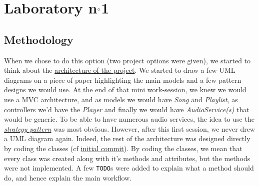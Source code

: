\documentclass{report}
\begin{document}
\section{Laboratory n$\degree$1}
\subsection{Methodology}

When we chose to do this option (two project options were given), we started to think about the \href{https://s3.amazonaws.com/applause-devmktg/2015/12/02/57kz3goral_YOU_DONT_SAY.png}{architecture of the project}. We started to draw a few UML diagrams on a piece of paper highlighting the main models and a few pattern designs we would use. At the end of that mini work-session, we knew we would use a MVC architecture, and as models we would have \textit{Song} and \textit{Playlist}, as controllers we'd have the \textit{Player} and finally we would have \textit{AudioService(s)} that would be generic. To be able to have numerous audio services, the idea to use the \href{https://en.wikipedia.org/wiki/Strategy_pattern}{\textit{strategy pattern}} was most obvious. However, after this first session, we never drew a UML diagram again. Indeed, the rest of the architecture was designed directly by coding the classes (cf \href{https://github.com/cnamal/arch-LOG8430/commit/d4953e0fc8fc3a7a8641dd7cacef69496f3ca011}{initial commit}). By coding the classes, we mean that every class was created along with it's methods and attributes, but the methods were not implemented. A few \texttt{TODO}s were added to explain what a method should do, and hence explain the main workflow.\\
\end{document}

